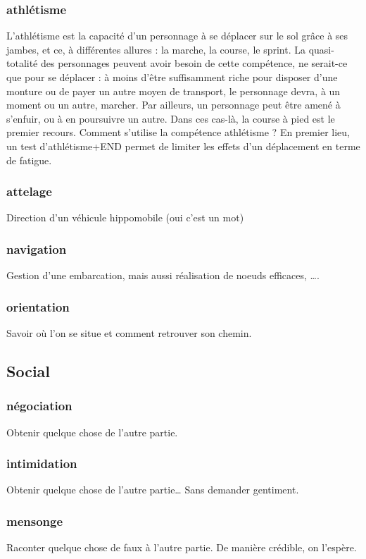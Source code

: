 \documentclass[10pt,a4paper,twocolumn]{book}
\begin{document}
\subsubsection{athlétisme}
L’athlétisme est la capacité d’un personnage à se déplacer sur le sol grâce à ses jambes, et ce, à différentes allures : la marche, la course, le sprint. La quasi-totalité des personnages peuvent avoir besoin de cette compétence, ne serait-ce que pour se déplacer : à moins d’être suffisamment riche pour disposer d’une monture ou de payer un autre moyen de transport, le personnage devra, à un moment ou un autre, marcher. Par ailleurs, un personnage peut être amené à s’enfuir, ou à en poursuivre un autre. Dans ces cas-là, la course à pied est le premier recours.
Comment s’utilise la compétence athlétisme ?
En premier lieu, un test d’athlétisme+END permet de limiter les effets d’un déplacement en terme de fatigue.

\subsubsection{attelage}
Direction d’un véhicule hippomobile (oui c’est un mot)
\subsubsection{navigation}
Gestion d’une embarcation, mais aussi réalisation de noeuds efficaces, ….
\subsubsection{orientation}
Savoir où l’on se situe et comment retrouver son chemin.
\subsection{Social}
\subsubsection{négociation}
Obtenir quelque chose de l’autre partie.
\subsubsection{intimidation}
Obtenir quelque chose de l’autre partie… Sans demander gentiment.
\subsubsection{mensonge}
Raconter quelque chose de faux à l’autre partie. De manière crédible, on l’espère.
\end{document}
